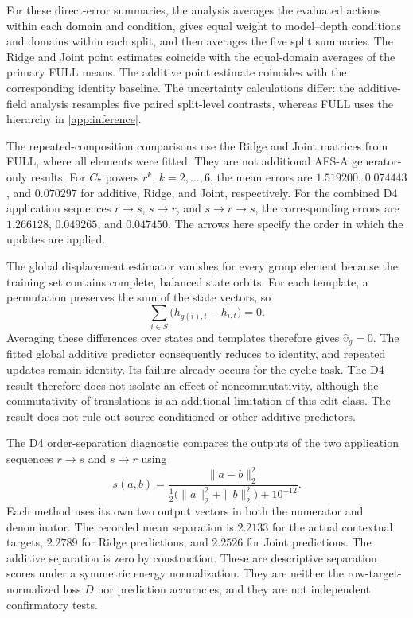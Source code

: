 For these direct-error summaries, the analysis averages
the evaluated actions within each domain and condition,
gives equal weight to model--depth conditions and
domains within each split, and then averages the
five split summaries.
The Ridge and Joint point estimates coincide with
the equal-domain averages of the primary FULL means.
The additive point estimate coincides with the
corresponding identity baseline.
The uncertainty calculations differ:
the additive-field analysis resamples five paired
split-level contrasts, whereas FULL uses the
hierarchy in \cref{app:inference}.

The repeated-composition comparisons use the Ridge
and Joint matrices from FULL, where all elements
were fitted.
They are not additional AFS-A generator-only results.
For $C_7$ powers $r^k$, $k=2,\ldots,6$, the mean
errors are $1.519200$, $0.074443$, and $0.070297$
for additive, Ridge, and Joint, respectively.
For the combined D4 application sequences
$r\to s$, $s\to r$, and $s\to r\to s$,
the corresponding errors are
$1.266128$, $0.049265$, and $0.047450$.
The arrows here specify the order in which the
updates are applied.

The global displacement estimator vanishes for every
group element because the training set contains
complete, balanced state orbits.
For each template, a permutation preserves the sum
of the state vectors, so
\[
 \sum_{i\in S}
 \bigl(h_{g(i),t}-h_{i,t}\bigr)=0.
\]
Averaging these differences over states and templates
therefore gives $\widehat v_g=0$.
The fitted global additive predictor consequently
reduces to identity, and repeated updates remain
identity.
Its failure already occurs for the cyclic task.
The D4 result therefore does not isolate an effect
of noncommutativity, although the commutativity
of translations is an additional limitation of
this edit class.
The result does not rule out source-conditioned
or other additive predictors.

The D4 order-separation diagnostic compares the
outputs of the two application sequences
$r\to s$ and $s\to r$ using
\[
 s(a,b)=
 \frac{\|a-b\|_2^2}
 {\tfrac12\bigl(\|a\|_2^2+\|b\|_2^2\bigr)+10^{-12}}.
\]
Each method uses its own two output vectors in
both the numerator and denominator.
The recorded mean separation is $2.2133$ for the
actual contextual targets, $2.2789$ for Ridge
predictions, and $2.2526$ for Joint predictions.
The additive separation is zero by construction.
These are descriptive separation scores under a
symmetric energy normalization.
They are neither the row-target-normalized loss
$D$ nor prediction accuracies, and they are not
independent confirmatory tests.


